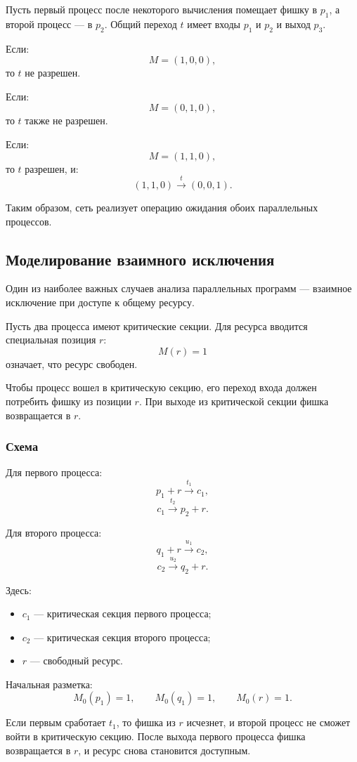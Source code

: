 \documentclass[12pt,a4paper]{article}
\begin{document}
Пусть первый процесс после некоторого вычисления помещает фишку в $p_1$, а второй процесс --- в $p_2$. Общий переход $t$ имеет входы $p_1$ и $p_2$ и выход $p_3$.

Если:
\[
M=(1,0,0),
\]
то $t$ не разрешен.

Если:
\[
M=(0,1,0),
\]
то $t$ также не разрешен.

Если:
\[
M=(1,1,0),
\]
то $t$ разрешен, и:
\[
(1,1,0) \xrightarrow{t} (0,0,1).
\]

Таким образом, сеть реализует операцию ожидания обоих параллельных процессов.

\subsection{Моделирование взаимного исключения}

Один из наиболее важных случаев анализа параллельных программ --- взаимное исключение при доступе к общему ресурсу.

Пусть два процесса имеют критические секции. Для ресурса вводится специальная позиция $r$:
\[
M(r)=1
\]
означает, что ресурс свободен.

Чтобы процесс вошел в критическую секцию, его переход входа должен потребить фишку из позиции $r$. При выходе из критической секции фишка возвращается в $r$.

\subsubsection{Схема}

Для первого процесса:
\[
p_1 + r \xrightarrow{t_1} c_1,
\]
\[
c_1 \xrightarrow{t_2} p_2 + r.
\]

Для второго процесса:
\[
q_1 + r \xrightarrow{u_1} c_2,
\]
\[
c_2 \xrightarrow{u_2} q_2 + r.
\]

Здесь:
\begin{itemize}
    \item $c_1$ --- критическая секция первого процесса;
    \item $c_2$ --- критическая секция второго процесса;
    \item $r$ --- свободный ресурс.
\end{itemize}

Начальная разметка:
\[
M_0(p_1)=1,
\qquad
M_0(q_1)=1,
\qquad
M_0(r)=1.
\]

Если первым сработает $t_1$, то фишка из $r$ исчезнет, и второй процесс не сможет войти в критическую секцию. После выхода первого процесса фишка возвращается в $r$, и ресурс снова становится доступным.
\end{document}
